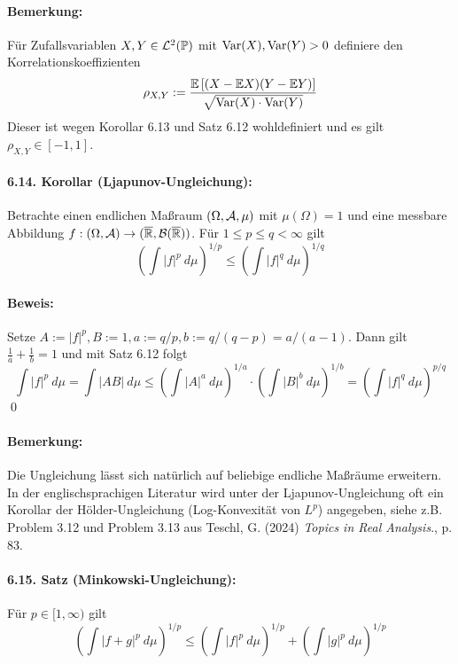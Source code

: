\documentclass[12pt]{report}
\begin{document}
\paragraph{Bemerkung:}F\"ur Zufallsvariablen $X,Y\in\mathcal{L}^2(\mathbb{P})$ mit $\operatorname{Var}(X),\operatorname{Var}(Y)>0$ definiere den Korrelationskoeffizienten
$$\rho_{X,Y}:=\dfrac{\mathbb{E}\left[(X-\mathbb{E} X)(Y-\mathbb{E} Y)\right]}{\sqrt{\operatorname{Var}(X)\cdot\operatorname{Var}(Y)}}$$
Dieser ist wegen Korollar 6.13 und Satz 6.12 wohldefiniert und es gilt $\rho_{X,Y}\in[-1,1]$.

\paragraph{6.14. Korollar (Ljapunov-Ungleichung):}Betrachte einen endlichen Ma\ss{}raum $(\Omega,\mathcal{A},\mu)$ mit $\mu(\Omega)=1$ und eine messbare Abbildung $f:(\Omega,\mathcal{A})\to(\overline{\mathbb{R}},\mathcal{B}(\overline{\mathbb{R}}))$. F\"ur $1\leq p\leq q<\infty$ gilt
$$\left(\int |f|^p\ d\mu\right)^{1/p}\leq\left(\int |f|^q\ d\mu\right)^{1/q}$$
 
 \paragraph{Beweis:}Setze $A:=|f|^p, B:=1, a:=q/p, b:=q/(q-p)=a/(a-1)$. Dann gilt $\frac{1}{a}+\frac{1}{b}=1$ und mit Satz 6.12 folgt
 $$\int |f|^p\ d\mu=\int |AB|\ d\mu\leq\left(\int |A|^a\ d\mu\right)^{1/a}\cdot\left(\int |B|^b\ d\mu\right)^{1/b}=\left(\int |f|^q\ d\mu\right)^{p/q}$$
 \qed
 
 \paragraph{Bemerkung:} Die Ungleichung l\"asst sich nat\"urlich auf beliebige endliche Ma\ss{}r\"aume erweitern. In der englischsprachigen Literatur wird unter der Ljapunov-Ungleichung oft ein Korollar der H\"older-Ungleichung (Log-Konvexit\"at von $L^p$) angegeben, siehe z.B. Problem 3.12  und Problem 3.13 aus Teschl, G. (2024) \textit{Topics in Real Analysis}., p. 83. 
 
 \paragraph{6.15. Satz (Minkowski-Ungleichung):}F\"ur $p\in[1,\infty)$ gilt
 $$\left(\int|f+g|^p\ d\mu\right)^{1/p}\leq\left(\int |f|^p\ d\mu\right)^{1/p}+\left(\int |g|^p\ d\mu\right)^{1/p}$$
 
\end{document}

